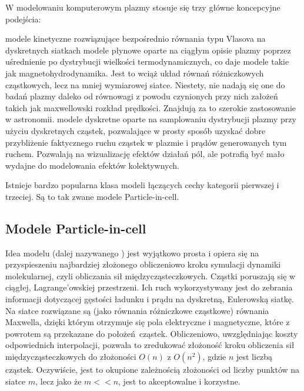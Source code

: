    W modelowaniu komputerowym plazmy stosuje się trzy główne koncepcyjne podejścia:
    \begin{enumerate}
        \itemi{} modele kinetyczne rozwiązujące bezpośrednio równania typu Vlasova
            na dyskretnych siatkach
        \itemi{} modele płynowe oparte na ciągłym opisie plazmy poprzez
            uśrednienie po dystrybucji wielkości termodynamicznych, co daje
            modele takie jak magnetohydrodynamika. Jest to wciąż układ równań
            różniczkowych cząstkowych, lecz na mniej wymiarowej siatce.
            Niestety, nie nadają się one do badań plazmy daleko od równowagi z
            powodu czynionych przy nich założeń takich jak maxwellowski rozkład
            prędkości. Znajdują za to szerokie zastosowanie w astronomii.
        \itemi{} modele dyskretne oparte na samplowaniu dystrybucji plazmy przy
            użyciu dyskretnych cząstek, pozwalające w prosty sposób uzyskać
            dobre przybliżenie faktycznego ruchu cząstek w plazmie i prądów
            generowanych tym ruchem. Pozwalają na wizualizację efektów działań
            pól, ale potrafią być mało wydajne do modelowania efektów kolektywnych.
    \end{enumerate}

    Istnieje bardzo popularna klasa modeli łączących cechy kategorii pierwszej i trzeciej.
    Są to tak zwane modele Particle-in-cell.

    \subsection{Modele Particle-in-cell}

    Idea modelu  (dalej nazywanego ) jest wyjątkowo
    prosta i opiera się na przyspieszeniu najbardziej złożonego obliczeniowo
    kroku symulacji dynamiki molekularnej, czyli obliczania sił
    międzycząsteczkowych.  Cząstki poruszają się w ciągłej, Lagrange'owskiej
    przestrzeni.  Ich ruch wykorzystywany jest do zebrania informacji dotyczącej
    gęstości ładunku i prądu na dyskretną, Eulerowską siatkę. Na siatce rozwiązane
    są (jako równania różniczkowe cząstkowe) równania Maxwella, dzięki którym
    otrzymuje się pola elektryczne i magnetyczne, które z powrotem są przekazane do
    położeń cząstek.  Obliczeniowo, uwzględniając koszty odpowiednich interpolacji,
    pozwala to zredukować złożoność kroku obliczenia sił międzycząsteczkowych
do złożoności $O(n)$ z $O(n^2)$, gdzie $n$ jest liczbą cząstek.
    Oczywiście, jest to okupione zależnością złożoności od liczby punktów na siatce $m$, lecz jako że $m << n$,
    jest to akceptowalne i korzystne.

